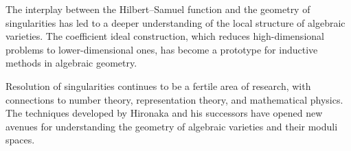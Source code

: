 The interplay between the Hilbert--Samuel function and the geometry of singularities has led to a deeper understanding of the local structure of algebraic varieties. The coefficient ideal construction, which reduces high-dimensional problems to lower-dimensional ones, has become a prototype for inductive methods in algebraic geometry.

Resolution of singularities continues to be a fertile area of research, with connections to number theory, representation theory, and mathematical physics. The techniques developed by Hironaka and his successors have opened new avenues for understanding the geometry of algebraic varieties and their moduli spaces.
